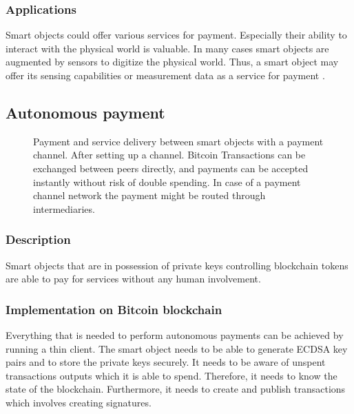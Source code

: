 \documentclass[10pt, conference,compsoc]{IEEEtran}
\begin{document}
\subsubsection{Applications}
Smart objects could offer various services for payment. Especially their ability to interact with the physical world is valuable. In many cases smart objects are augmented by sensors to digitize the physical world. Thus, a smart object may offer its sensing capabilities or measurement data as a service for payment \cite{DBLP:journals/corr/NoyenVWF14,Worner:2014:YSE:2638728.2638786}.

\subsection{Autonomous payment}

\begin{figure}[!t]
\centering
{}
\hfil
{}
\caption{Payment and service delivery between smart objects with a payment channel. After setting up a channel. Bitcoin Transactions can be exchanged between peers directly, and payments can be accepted instantly without risk of double spending. In case of a payment channel network the payment might be routed through intermediaries.}
\label{fig:paymentchannel}
\end{figure}

\subsubsection{Description}

Smart objects that are in possession of private keys controlling blockchain tokens are able to pay for services without any human involvement.

\subsubsection{Implementation on Bitcoin blockchain}

Everything that is needed to perform autonomous payments can be achieved by running a thin client. The smart object needs to be able to generate ECDSA key pairs and to store the private keys securely. It needs to be aware of unspent transactions outputs which it is able to spend. Therefore, it needs to know the state of the blockchain. Furthermore, it needs to create and publish transactions which involves creating signatures.
\end{document}
